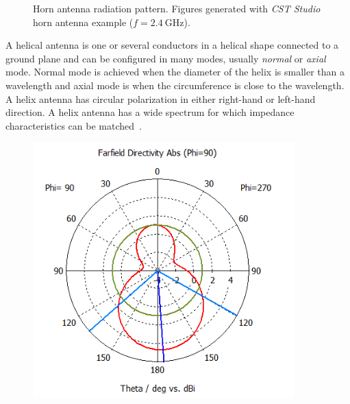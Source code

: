 \begin{figure}[H]
\begin{minipage}{0.45\textwidth}
    \end{minipage}
    \caption{Horn antenna radiation pattern. Figures generated with \textit{CST Studio} horn antenna example ($f=\SI{2.4}{\giga\hertz}$).}
    \label{fig:horn_1}
\end{figure}

A helical antenna is one or several conductors in a helical shape connected to a ground plane and can be configured in many modes, usually \textit{normal} or \textit{axial} mode. Normal mode is achieved when the diameter of the helix is smaller than a wavelength and axial mode is when the circumference is close to the wavelength. A helix antenna has circular polarization in either right-hand or left-hand direction. A helix antenna has a wide spectrum for which impedance characteristics can be matched~\cite[p. 12.2]{ant_eng_hk}.
\begin{figure}[H]
    \begin{minipage}{0.45\textwidth}
        \centering
        \includegraphics[width=0.9\textwidth]{figures/farfield (f=2.4) helical.png} %
    \end{minipage}\hfill
    \begin{minipage}{0.45\textwidth}
        \centering

\end{minipage}
\end{figure}
